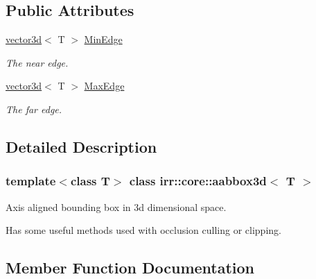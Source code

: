 \subsection*{Public Attributes}
\begin{DoxyCompactItemize}
\item 
\mbox{\label{classirr_1_1core_1_1aabbox3d_ad07afdbfa85c78ddddaebd0e0aa6c287}} 
\hyperlink{classirr_1_1core_1_1vector3d}{vector3d}$<$ T $>$ \hyperlink{classirr_1_1core_1_1aabbox3d_ad07afdbfa85c78ddddaebd0e0aa6c287}{Min\+Edge}
\begin{DoxyCompactList}\small\item\em The near edge. \end{DoxyCompactList}\item 
\mbox{\label{classirr_1_1core_1_1aabbox3d_af25a0e1869a3a6303875b52e37645b06}} 
\hyperlink{classirr_1_1core_1_1vector3d}{vector3d}$<$ T $>$ \hyperlink{classirr_1_1core_1_1aabbox3d_af25a0e1869a3a6303875b52e37645b06}{Max\+Edge}
\begin{DoxyCompactList}\small\item\em The far edge. \end{DoxyCompactList}\end{DoxyCompactItemize}


\subsection{Detailed Description}
\subsubsection*{template$<$class T$>$\newline
class irr\+::core\+::aabbox3d$<$ T $>$}

Axis aligned bounding box in 3d dimensional space. 

Has some useful methods used with occlusion culling or clipping. 

\subsection{Member Function Documentation}
\mbox{\label{classirr_1_1core_1_1aabbox3d_a7ccc210a3fb0ce82765d28f2047942c5}} 
